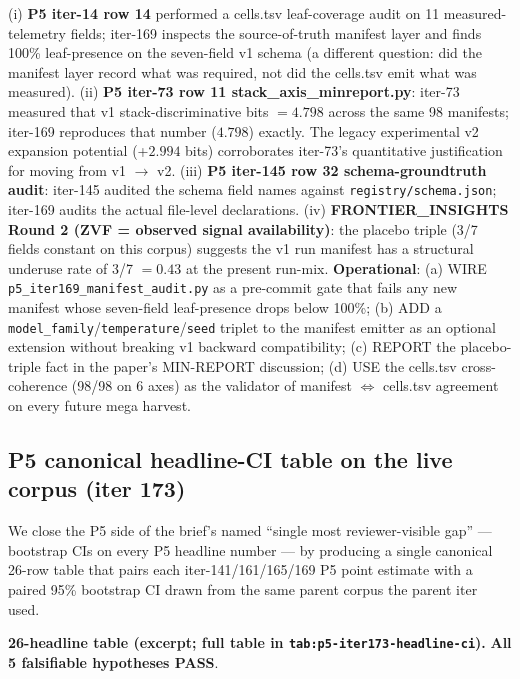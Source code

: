\documentclass{article}  \usepackage[preprint,nonatbib]{neurips_2026} \usepackage[numbers]{natbib}
\begin{document}
(i) \textbf{P5 iter-14 row 14} performed a cells.tsv leaf-coverage audit on 11 measured-telemetry fields; iter-169 inspects the source-of-truth manifest layer and finds 100\% leaf-presence on the seven-field v1 schema (a different question: did the manifest layer record what was required, not did the cells.tsv emit what was measured). (ii) \textbf{P5 iter-73 row 11 stack\_axis\_minreport.py}: iter-73 measured that v1 stack-discriminative bits $= 4.798$ across the same 98 manifests; iter-169 reproduces that number ($4.798$) exactly. The legacy experimental v2 expansion potential (+$2.994$ bits) corroborates iter-73's quantitative justification for moving from v1 $\to$ v2. (iii) \textbf{P5 iter-145 row 32 schema-groundtruth audit}: iter-145 audited the schema field names against \texttt{registry/schema.json}; iter-169 audits the actual file-level declarations. (iv) \textbf{FRONTIER\_INSIGHTS Round 2 (ZVF = observed signal availability)}: the placebo triple (3/7 fields constant on this corpus) suggests the v1 run manifest has a structural underuse rate of 3/7 $= 0.43$ at the present run-mix. \textbf{Operational}: (a) WIRE \texttt{p5\_iter169\_manifest\_audit.py} as a pre-commit gate that fails any new manifest whose seven-field leaf-presence drops below 100\%; (b) ADD a \texttt{model\_family}/\texttt{temperature}/\texttt{seed} triplet to the manifest emitter as an optional extension without breaking v1 backward compatibility; (c) REPORT the placebo-triple fact in the paper's MIN-REPORT discussion; (d) USE the cells.tsv cross-coherence (98/98 on 6 axes) as the validator of manifest $\Leftrightarrow$ cells.tsv agreement on every future mega harvest.
 \subsection{P5 canonical headline-CI table on the live corpus (iter 173)}
\label{sec:p5-iter173-headline-ci}

We close the P5 side of the brief's named ``single most reviewer-visible
gap'' --- bootstrap CIs on every P5 headline number --- by producing a
single canonical 26-row table that pairs each iter-141/161/165/169 P5
point estimate with a paired 95\% bootstrap CI drawn from the same parent
corpus the parent iter used.

\noindent\textbf{26-headline table (excerpt; full table in
\texttt{tab:p5-iter173-headline-ci}).} \textbf{All 5 falsifiable
hypotheses PASS}.
\end{document}
